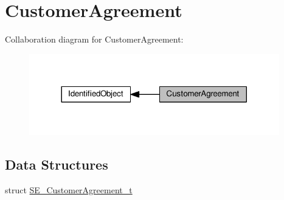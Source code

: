 \hypertarget{group__CustomerAgreement}{}\section{Customer\+Agreement}
\label{group__CustomerAgreement}
Collaboration diagram for Customer\+Agreement\+:\nopagebreak
\begin{figure}[H]
\begin{center}
\leavevmode
\includegraphics[width=308pt]{group__CustomerAgreement}
\end{center}
\end{figure}
\subsection*{Data Structures}
\begin{DoxyCompactItemize}
\item 
struct \hyperlink{structSE__CustomerAgreement__t}{S\+E\+\_\+\+Customer\+Agreement\+\_\+t}
\end{DoxyCompactItemize}

